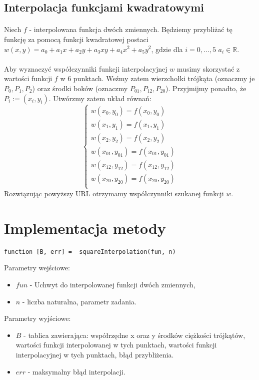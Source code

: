 \documentclass{article}
\begin{document}
\subsection{Interpolacja funkcjami kwadratowymi}
\paragraph{}
Niech $f$ - interpolowana funkcja dwóch zmiennych. Będziemy przybliżać tę funkcję za pomocą funkcji kwadratowej postaci $w(x,y) = a_0 + a_1x + a_2y + a_3xy + a_4x^2 + a_5y^2$, gdzie dla $i=0,\dots,5$  $a_i \in \mathbb{R}$.
\paragraph{}
Aby wyznaczyć współczynniki funkcji interpolacyjnej $w$ musimy skorzystać z wartości funkcji $f$ w 6 punktach. Weźmy zatem wierzchołki trójkąta (oznaczmy je $P_0, P_1, P_2$) oraz środki boków (oznaczmy $P_{01}, P_{12}, P_{20}$). Przyjmijmy ponadto, że $P_i := (x_i, y_i)$. Utwórzmy zatem układ równań:
$$
\left\{ 
\begin{array}{c}
w(x_0,y_0) = f(x_0, y_0) \\ 
w(x_1,y_1) = f(x_1, y_1) \\ 
w(x_2,y_2) = f(x_2, y_2) \\ 
w(x_{01},y_{01}) = f(x_{01}, y_{01}) \\
w(x_{12},y_{12}) = f(x_{12}, y_{12}) \\
w(x_{20},y_{20}) = f(x_{20}, y_{20}) \\ 
\end{array}
\right.
$$
Rozwiązując powyższy URL otrzymamy współczynniki szukanej funkcji $w$.
\section{Implementacja metody}
\paragraph{}
\begin{lstlisting}[style=Matlab-editor]
function [B, err] =  squareInterpolation(fun, n)
\end{lstlisting}
\vspace{4pt}
Parametry wejściowe:
\begin{itemize}
\item $fun$ - Uchwyt do interpolowanej funkcji dwóch zmiennych,
\item $n$ - liczba naturalna, parametr zadania.
\end{itemize}
Parametry wyjściowe:
\begin{itemize}
\item $B$ - tablica zawierająca: współrzędne x oraz y środków ciężkości trójkątów, wartości funkcji interpolowanej w tych punktach, wartości funkcji interpolacyjnej w tych punktach, błąd przybliżenia.
\item $err$ - maksymalny błąd interpolacji.
\end{itemize}
\end{document}
